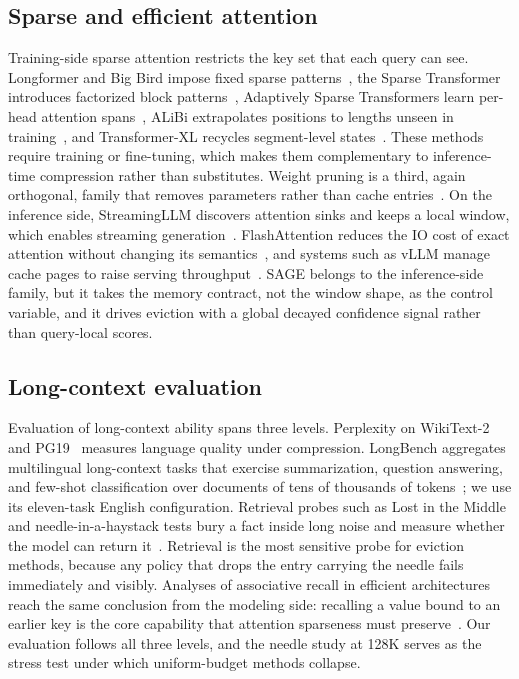 \subsection{Sparse and efficient attention}

Training-side sparse attention restricts the key set that each query
can see. Longformer and Big Bird impose fixed sparse
patterns~\cite{beltagy2020longformer,zaheer2020big}, the Sparse
Transformer introduces factorized block patterns~\cite{child2019generating},
Adaptively Sparse Transformers learn per-head attention
spans~\cite{correia2019adaptively}, ALiBi extrapolates positions to
lengths unseen in training~\cite{press2021alibi}, and Transformer-XL
recycles segment-level states~\cite{dai2019transformer}. These methods
require training or fine-tuning, which makes them complementary to
inference-time compression rather than substitutes. Weight pruning is
a third, again orthogonal, family that removes parameters rather than
cache entries~\cite{frantar2023sparsegpt}. On the inference
side, StreamingLLM discovers attention sinks and keeps a local window,
which enables streaming generation~\cite{xiao2023efficient}. FlashAttention
reduces the IO cost of exact attention without changing its
semantics~\cite{dao2022flashattention,dao2023flashattention2}, and
systems such as vLLM manage cache pages to raise serving
throughput~\cite{kwon2023vllm}. SAGE belongs to the inference-side
family, but it takes the memory contract, not the window shape, as the
control variable, and it drives eviction with a global decayed
confidence signal rather than query-local scores.

\subsection{Long-context evaluation}

Evaluation of long-context ability spans three levels. Perplexity on
WikiText-2~\cite{merity2016pointer} and PG19~\cite{rae2019compressive}
measures language quality under compression. LongBench aggregates
multilingual long-context tasks that exercise summarization, question
answering, and few-shot classification over documents of tens of
thousands of tokens~\cite{bai2023longbench}; we use its eleven-task
English configuration. Retrieval probes such as Lost in the
Middle and needle-in-a-haystack tests bury a fact inside long noise
and measure whether the model can return
it~\cite{liu2023lost}. Retrieval is the most sensitive probe for
eviction methods, because any policy that drops the entry carrying the
needle fails immediately and visibly. Analyses of associative recall
in efficient architectures reach the same conclusion from the modeling
side: recalling a value bound to an earlier key is the core capability
that attention sparseness must preserve~\cite{su2024zoology}. Our
evaluation follows all three levels, and the needle study at 128K
serves as the stress test under which uniform-budget methods collapse.

